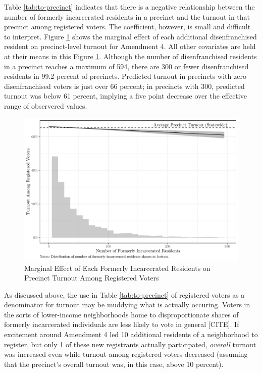 \documentclass[
  12pt,
]{article}
\begin{document}
Table \ref{tab:to-precinct} indicates that there is a negative relationship between the number of formerly incarcerated residents in a precinct and the turnout in that precinct among registered voters. The coefficient, however, is small and difficult to interpret. Figure \ref{fig:marg1} shows the marginal effect of each additional disenfranchised resident on precinct-level turnout for Amendment 4. All other covariates are held at their means in this Figure \ref{fig:marg1}. Although the number of disenfranchised residents in a precinct reaches a maximum of 594, there are 300 or fewer disenfranchised residents in 99.2 percent of precincts. Predicted turnout in precincts with zero disenfranchised voters is just over 66 percent; in precincts with 300, predicted turnout was below 61 percent, implying a five point decrease over the effective range of observered values.

\begin{figure}[H]

{\centering \includegraphics{write_files/figure-latex/marg1-1} 

}

\caption{\label{fig:marg1}Marginal Effect of Each Formerly Incarcerated Residents on Precinct Turnout Among Registered Voters}\label{fig:marg1}
\end{figure}

As discussed above, the use in Table \ref{tab:to-precinct} of registered voters as a denominator for turnout may be muddying what is actually occuring. Voters in the sorts of lower-income neighborhoods home to disproportionate shares of formerly incarcerated individuals are less likely to vote in general {[}CITE{]}. If excitement around Amendment 4 led 10 additional residents of a neighborhood to register, but only 1 of these new registrants actually participated, \emph{overall} turnout was increased even while turnout among registered voters decreased (assuming that the precinct's overall turnout was, in this case, above 10 percent).
\end{document}
